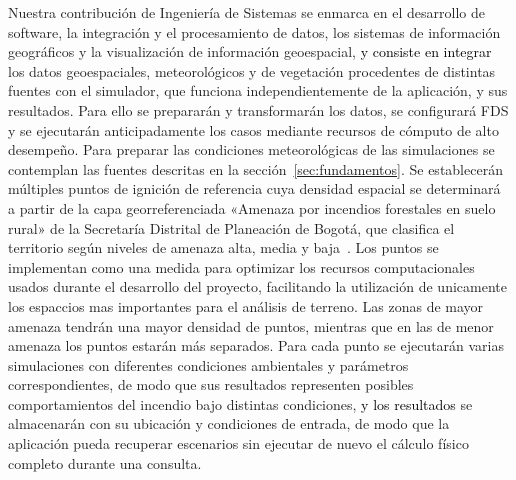 Nuestra contribución de Ingeniería de Sistemas se enmarca en el desarrollo de software, la integración y el procesamiento de datos, los sistemas de información geográficos y la visualización de información geoespacial, \textcolor{black}{y consiste en integrar} los datos geoespaciales, meteorológicos y de vegetación procedentes de distintas fuentes con el simulador, que funciona independientemente de la aplicación, y sus resultados. Para ello se prepararán y transformarán los datos, se configurará FDS y se ejecutarán anticipadamente los casos mediante recursos de cómputo de alto desempeño. Para preparar las condiciones meteorológicas de las simulaciones se contemplan las fuentes descritas en la sección~\ref{sec:fundamentos}. Se establecerán múltiples puntos de ignición de referencia cuya densidad espacial se determinará a partir de la capa georreferenciada «Amenaza por incendios forestales en suelo rural» de la Secretaría Distrital de Planeación de Bogotá, que clasifica el territorio según niveles de amenaza alta, media y baja~\cite{sdppotamenaza40}. Los puntos se implementan como una medida para optimizar los recursos computacionales usados durante el desarrollo del proyecto, facilitando la utilización de unicamente los espaccios mas importantes para el análisis de terreno. Las zonas de mayor amenaza tendrán una mayor densidad de puntos, mientras que en las de menor amenaza los puntos estarán más separados. Para cada punto se ejecutarán varias simulaciones con diferentes condiciones ambientales y parámetros correspondientes, de modo que sus resultados representen posibles comportamientos del incendio bajo distintas condiciones, \textcolor{black}{y los resultados} se almacenarán con su ubicación y condiciones de entrada, de modo que la aplicación pueda recuperar escenarios sin ejecutar de nuevo el cálculo físico completo durante una consulta.


